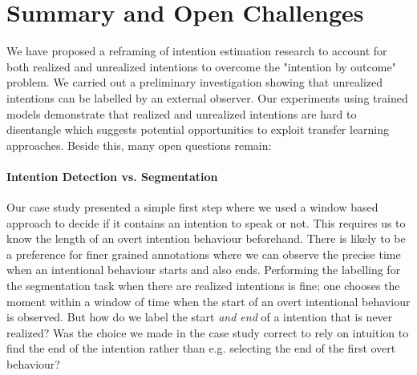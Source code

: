 \documentclass[sigconf]{acmart}
\begin{document}


\section{Summary and Open Challenges}
%
We have proposed a reframing of intention estimation research to account for both realized and unrealized intentions to overcome the "intention by outcome" problem. We carried out a preliminary investigation showing that unrealized intentions can be labelled by an external observer. Our experiments using trained models demonstrate that realized and unrealized intentions are hard to disentangle which suggests potential opportunities to exploit transfer learning approaches. Beside this, many open questions remain:

\paragraph {Intention Detection vs. Segmentation}
Our case study presented a simple first step where we used a window based approach to decide if it contains an intention to speak or not. This requires us to know the length of an overt intention behaviour beforehand. There is likely to be a preference for finer grained annotations where we can observe the precise time when an intentional behaviour starts and also ends. Performing the labelling for the segmentation task when there are realized intentions is fine; one chooses the moment within a window of time when the start of an overt intentional behaviour is observed. But how do we label the start \emph{and end} of a intention that is never realized? Was the choice we made in the case study correct to rely on intuition to find the end of the intention rather than e.g. selecting the end of the first overt behaviour?
\end{document}
